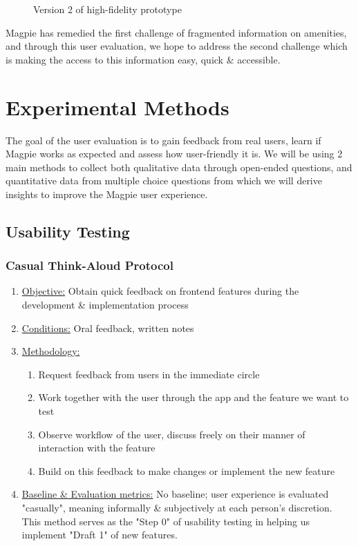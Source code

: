 \documentclass{report}
\begin{document}
\begin{figure}
\begin{minipage}{0.45\textwidth}
        \caption{Version 2 of high-fidelity prototype}
        \label{fig:plot8}
    \end{minipage}
\end{figure}

\noindent{}Magpie has remedied the first challenge of fragmented information on
amenities, and through this user evaluation, we hope to address the second challenge
which is making the access to this information easy, quick \& accessible.

\chapter{Experimental Methods}
The goal of the user evaluation is to gain feedback from real users, learn if
Magpie works as expected and assess how user-friendly it is. We will be using 2
main methods to collect both qualitative data through open-ended questions, and
quantitative data from multiple choice questions from which we will derive
insights to improve the Magpie user experience.
\section{Usability Testing}
\subsection{Casual Think-Aloud Protocol}
\begin{enumerate}
    \item \underline{Objective:} Obtain quick feedback on frontend features during the development \& implementation process
    \item \underline{Conditions:} Oral feedback, written notes
    \item \underline{Methodology:}
          \begin{enumerate}
              \item Request feedback from users in the immediate circle
              \item Work together with the user through the app and the feature we want to test
              \item Observe workflow of the user, discuss freely on their manner of interaction with the feature
              \item Build on this feedback to make changes or implement the new feature
          \end{enumerate}
    \item \underline{Baseline \& Evaluation metrics:} No baseline; user experience is evaluated "casually", meaning informally \& subjectively at each person's discretion. This method serves as the "Step 0" of usability testing in helping us implement "Draft 1" of new features.
\end{enumerate}
\end{document}
